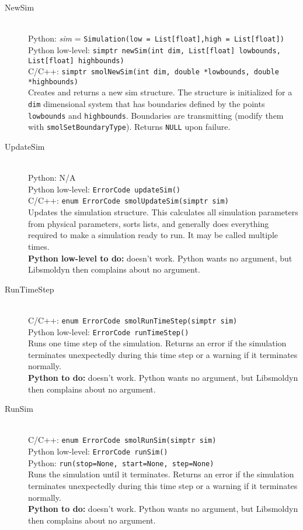 \documentclass {book}
\newcommand {\ttt} {\texttt}
\begin{document}
\begin{description}

\item[NewSim]
\hfill \\
Python: \textit{sim} = \ttt{Simulation(low = List[float],high = List[float])}\\
Python low-level: \ttt{simptr newSim(int dim, List[float] lowbounds, List[float] highbounds)}\\
C/C++: \ttt{simptr smolNewSim(int dim, double *lowbounds, double *highbounds)}\\
Creates and returns a new sim structure. The structure is initialized for a \ttt{dim} dimensional system that has boundaries defined by the points \ttt{lowbounds} and \ttt{highbounds}. Boundaries are transmitting (modify them with \ttt{smolSetBoundaryType}). Returns \ttt{NULL} upon failure.

\item[UpdateSim]
\hfill \\
Python: N/A\\
Python low-level: \ttt{ErrorCode updateSim()}\\
C/C++: \ttt{enum ErrorCode smolUpdateSim(simptr sim)}\\
Updates the simulation structure. This calculates all simulation parameters from physical parameters, sorts lists, and generally does everything required to make a simulation ready to run. It may be called multiple times.\\
\textbf{Python low-level to do:} doesn't work. Python wants no argument, but Libsmoldyn then complains about no argument.

\item[RunTimeStep]
\hfill \\
C/C++: \ttt{enum ErrorCode smolRunTimeStep(simptr sim)}\\
Python low-level: \ttt{ErrorCode runTimeStep()}\\
Runs one time step of the simulation. Returns an error if the simulation terminates unexpectedly during this time step or a warning if it terminates normally.\\
\textbf{Python to do:} doesn't work. Python wants no argument, but Libsmoldyn then complains about no argument.

\item[RunSim]
\hfill \\
C/C++: \ttt{enum ErrorCode smolRunSim(simptr sim)}\\
Python low-level: \ttt{ErrorCode runSim()}\\
Python: \ttt{run(stop=None, start=None, step=None)}\\
Runs the simulation until it terminates. Returns an error if the simulation terminates unexpectedly during this time step or a warning if it terminates normally.\\
\textbf{Python to do:} doesn't work. Python wants no argument, but Libsmoldyn then complains about no argument.


\end{description}
\end{document}
